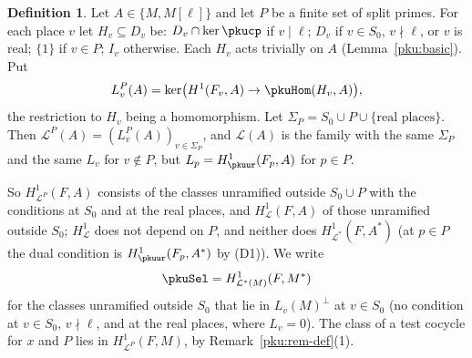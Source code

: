 \documentclass[10pt]{amsart}
\theoremstyle{definition}
\newtheorem{definition}[theorem]{Definition}
\theoremstyle{remark}
\begin{document}
\begin{definition}\label{pku:def-sel}
Let $A\in\{M,M[\ell]\}$ and let $P$ be a finite set of split primes. For each place $v$ let $H_v
\subseteq D_v$ be: $D_v\cap\ker\pkucp$ if $v\mid\ell$; $D_v$ if $v\in S_0$, $v\nmid\ell$, or $v$ is
real; $\{1\}$ if $v\in P$; $I_v$ otherwise. Each $H_v$ acts trivially on $A$
(Lemma~\ref{pku:basic}). Put
\[
L^P_v(A)=\ker\bigl(H^1(F_v,A)\to\pkuHom(H_v,A)\bigr),
\]
the restriction to $H_v$ being a homomorphism. Let $\Sigma_P=S_0\cup P\cup\{\text{real places}\}$.
Then $\mathcal L^P(A)=(L^P_v(A))_{v\in\Sigma_P}$, and $\mathcal L(A)$ is the family with the same
$\Sigma_P$ and the same $L_v$ for $v\notin P$, but $L_p=H^1_\pkuur(F_p,A)$ for $p\in P$.
\end{definition}

So $H^1_{\mathcal L^P}(F,A)$ consists of the classes unramified outside $S_0\cup P$ with the
conditions at $S_0$ and at the real places, and $H^1_{\mathcal L}(F,A)$ of those unramified outside
$S_0$; $H^1_{\mathcal L}$ does not depend on $P$, and neither does $H^1_{\mathcal L^*}(F,A^*)$
(at $p\in P$ the dual condition is $H^1_\pkuur(F_p,A^*)$ by (D1)). We write
\[
\pkuSel=H^1_{\mathcal L^*(M)}(F,M^*)
\]
for the classes unramified outside $S_0$ that lie in $L_v(M)^\perp$ at $v\in S_0$ (no condition at
$v\in S_0$, $v\nmid\ell$, and at the real places, where $L_v=0$). The class of a test cocycle for
$x$ and $P$ lies in $H^1_{\mathcal L^P}(F,M)$, by Remark~\ref{pku:rem-def}(1).
\end{document}

